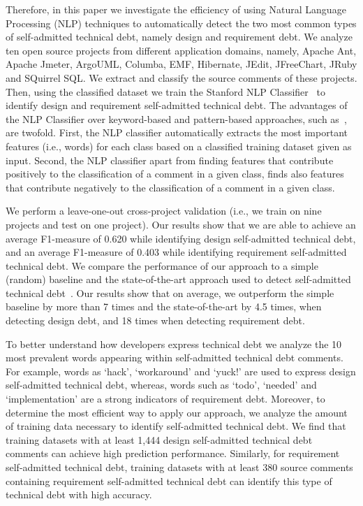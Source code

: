 \documentclass[10pt,journal,compsoc]{IEEEtran}
\newcommand{\SATD}{self-admitted technical debt\xspace}
\begin{document}
Therefore, in this paper we investigate the efficiency of using Natural Language Processing (NLP) techniques to automatically detect the two most common types of \SATD, namely design and requirement debt. We analyze ten open source projects from different application domains, namely, Apache Ant, Apache Jmeter, ArgoUML, Columba, EMF, Hibernate, JEdit, JFreeChart, JRuby and SQuirrel SQL. We extract and classify the source comments of these projects. Then, using the classified dataset we train the Stanford NLP Classifier~\cite{Manning2014ACL} to identify design and requirement \SATD.
The advantages of the NLP Classifier over keyword-based and pattern-based approaches, such as~\cite{Potdar2014ICSME}, are twofold. First, the NLP classifier automatically extracts the most important features (i.e., words) for each class based on a classified training dataset given as input. Second, the NLP classifier apart from finding features that contribute positively to the classification of a comment in a given class, finds also features that contribute negatively to the classification of a comment in a given class.

We perform a leave-one-out cross-project validation (i.e., we train on nine projects and test on one project). Our results show that we are able to  achieve an average F1-measure of 0.620 while identifying design \SATD, and an average F1-measure of 0.403 while identifying requirement \SATD. We compare the performance of our approach to a simple (random) baseline and the state-of-the-art approach used to detect \SATD~\cite{Potdar2014ICSME}. Our results show that on average, we outperform the simple baseline by more than 7 times and the state-of-the-art by 4.5 times, when detecting design debt, and 18 times when detecting requirement debt.

To better understand how developers express technical debt we analyze the 10 most prevalent words appearing within \SATD comments. For example, words as `hack', `workaround' and `yuck!' are used to express design \SATD, whereas, words such as `todo', `needed' and `implementation' are a strong indicators of requirement debt.
Moreover, to determine the most efficient way to apply our approach, we analyze the amount of training data necessary to identify \SATD. We find that training datasets with at least 1,444 design \SATD comments can achieve high prediction performance. Similarly, for requirement \SATD, training datasets with at least 380 source comments containing requirement \SATD can identify this type of technical debt with high accuracy.  
\end{document}
